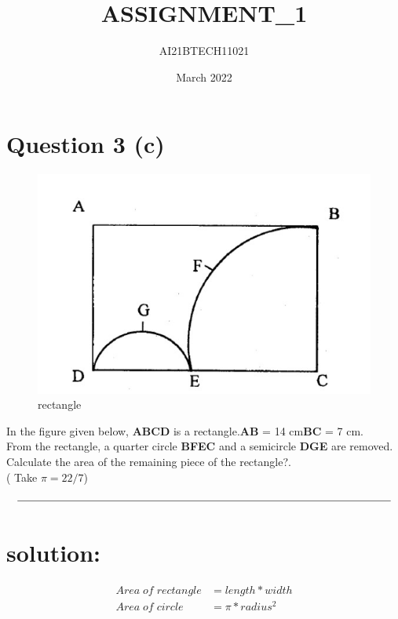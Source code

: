 \documentclass{article}
\title{ASSIGNMENT_1}
\author{AI21BTECH11021}
\date{March 2022}
\begin{document}
\maketitle

\section*{Question 3 (c)}
\begin{figure}[h!]
    \centering
    \includegraphics[scale = 0.5]{Figure_1.jpg}
    \caption{rectangle}
    \label{fig:my_label}
\end{figure}

In the figure given below, \textbf{ABCD} is a rectangle.\textbf{AB} = 14 cm\textbf{BC} = 7 cm.\\
From the rectangle, a quarter circle \textbf{BFEC} and a semicircle \textbf{DGE} are removed.\\
Calculate the area of the remaining piece of the rectangle?.\\
( Take $ \pi = 22/7 $)\\

\begin{align*}
\rule{\textwidth}{0.4pt}\\    
\end{align*}

\section*{solution:}
\begin{center}
\begin{align*}
    Area\;of\;rectangle &= length*width\\
    Area\;of\;circle &=\pi*radius^2 \\
\end{align*}
\end{center}
\end{document}
